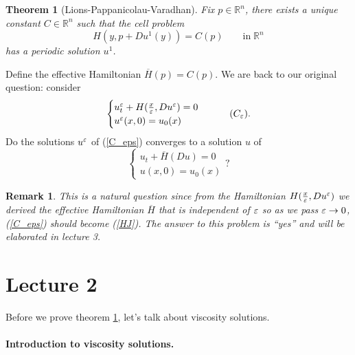 \documentclass[12pt, oneside]{amsart}  	%
\newtheorem{remark}{Remark}
\newtheorem{theorem}{Theorem}
\begin{document}
\begin{theorem}[Lions-Pappanicolau-Varadhan]\label{theorem1}
 Fix $p\in \mathbb{R}^n$, there exists a unique constant $C\in \mathbb{R}^n$ such that the cell problem
\begin{equation*}
H(y, p+Du^1(y)) = C(p) \qquad\text{in}\;\mathbb{R}^n
\end{equation*}
has a periodic solution $u^1$.
\end{theorem}
Define the effective Hamiltonian $\overline{H}(p) = C(p)$. We are back to our original question: consider
\begin{equation}\label{C_eps}
	\begin{cases}
		u^\eps_t + H(\frac{x}{\eps}, Du^\eps)=0\\
		u^\eps(x,0)=u_0(x)
	\end{cases}\tag{$C_\eps$}.
\end{equation}
Do the solutions $u^\varepsilon$ of (\ref{C_eps}) converges to a solution $u$ of
\begin{equation} \label{HJ}
	\begin{cases}
		u_t + \overline{H}(Du)=0\\
		u(x,0)=u_0(x)
	\end{cases}?\tag{HJ} 
\end{equation}
\begin{remark} This is a natural question  since from the Hamiltonian $H(\frac{x}{\varepsilon}, Du^\varepsilon)$ we derived the effective Hamiltonian $\overline{H}$ that is independent of $\varepsilon$ so as we pass $\varepsilon\to 0$, (\ref{C_eps}) should become (\ref{HJ}). The answer to this problem is ``yes'' and will be elaborated in lecture 3.
\end{remark}






\newpage


\section*{{\LARGE Lecture 2}}
\vspace*{0.5cm}

Before we prove theorem \ref{theorem1}, let's talk about viscosity solutions. \vspace*{0.5cm}

\paragraph{\textbf{Introduction to viscosity solutions.}}
\end{document}
